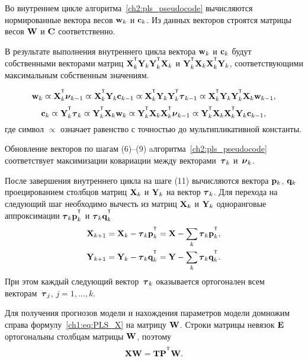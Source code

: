 \documentclass[11pt, a5paper]{dissert}
\begin{document}
Во внутреннем цикле алгоритма~\ref{ch2:pls_pseudocode} вычисляются нормированные вектора весов $\mathbf{w}_k$ и $\mathbf{c}_k$. 
Из данных векторов строятся матрицы весов $\mathbf{W}$ и $\mathbf{C}$ соответственно.

\begin{statement}
	В результате выполнения внутреннего цикла вектора $\mathbf{w}_k$ и $\mathbf{c}_k$ будут собственными векторами матриц $\bX_k^{\T} \bY_k \bY_k^{\T} \bX_k$ и $\bY_k^{\T} \bX_k \bX_k^{\T} \bY_k$, соответствующими максимальным собственным значениям.
	
	\begin{equation*}
		\bw_k \varpropto \bX_k^{\T} \bnu_{k-1} \varpropto \bX_k^{\T} \bY_k \bc_{k-1} \varpropto \bX_k^{\T} \bY_k \bY_k^{\T} \btau_{k-1} \varpropto \bX_k^{\T} \bY_k \bY_k^{\T} \bX_k \bw_{k-1},
	\end{equation*}
	\begin{equation*}
		\bc_k \varpropto \bY_k^{\T} \btau_k \varpropto \bY_k^{\T} \bX_k \bw_k \varpropto \bY_k^{\T} \bX_k \bX_k^{\T} \bnu_{k-1} \varpropto \bY_k^{\T} \bX_k \bX_k^{\T} \bY_k \bc_{k-1},
	\end{equation*}
	где символ $\varpropto$ означает равенство с точностью до мультипликативной константы. 
	\label{ch2:stat:eig}
\end{statement}

\begin{statement}
	Обновление векторов по шагам (6)--(9) aлгоритма~\ref{ch2:pls_pseudocode} соответствует максимизации ковариации между векторами~$\boldsymbol{\tau}_k$ и~$\boldsymbol{\nu}_k$.
\end{statement}

После завершения внутреннего цикла на шаге (11) вычисляются вектора $\mathbf{p}_k$, $\mathbf{q}_k$ проецированием столбцов матриц $\mathbf{X}_k$ и $\mathbf{Y}_k$ на вектор $\boldsymbol{\tau}_k$. 
Для перехода на следующий шаг необходимо вычесть из матриц $\mathbf{X}_k$ и $\mathbf{Y}_k$ одноранговые аппроксимации $\btau_k \bp_k^{\T}$ и $\btau_k \bq_k^{\T}$
\begin{align*}
	\bX_{k + 1} &= \bX_{k} - \btau_k \bp_k^{\T} = \bX - \sum_k \btau_k \bp_k^{\T}, \\
	\bY_{k + 1} &= \bY_{k} - \btau_k \bq_k^{\T} = \bY - \sum_k \btau_k \bq_k^{\T}.
\end{align*}
При этом каждый следующий вектор~$\boldsymbol{\tau}_k$ оказывается ортогонален всем векторам~$\boldsymbol{\tau}_j$, $j=1, \dots, k$.

Для получения прогнозов модели и нахождения параметров модели 
домножим справа формулу~\eqref{ch1:eq:PLS_X} на матрицу $\mathbf{W}$. Строки матрицы невязок $\mathbf{E}$ ортогональны столбцам матрицы $\mathbf{W}$, поэтому 
\[
\bX \bW = \bT \bP^{\T} \bW.
\] 
\end{document}
